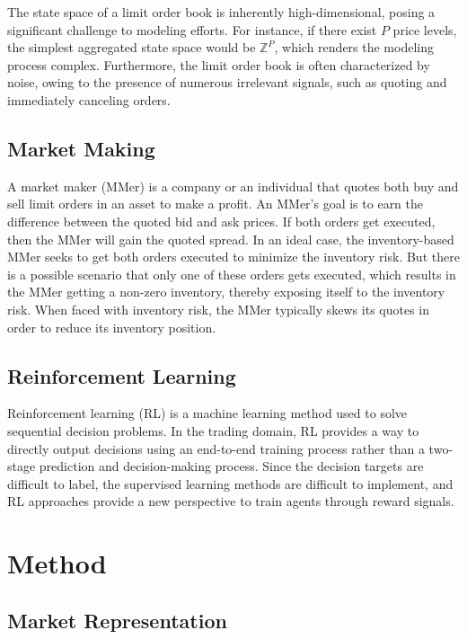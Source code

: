 \documentclass[conference]{IEEEtran}
\begin{document}
The state space of a limit order book is inherently high-dimensional, posing a significant challenge to modeling efforts. For instance, if there exist $P$ price levels, the simplest aggregated state space would be $\mathbb{Z}^{P}$, which renders the modeling process complex. Furthermore, the limit order book is often characterized by noise, owing to the presence of numerous irrelevant signals, such as quoting and immediately canceling orders.

\subsection{Market Making}
A market maker (MMer) is a company or an individual that quotes both buy and sell limit orders in an asset to make a profit. An MMer's goal is to earn the difference between the quoted bid and ask prices. If both orders get executed, then the MMer will gain the quoted spread. In an ideal case, the inventory-based MMer seeks to get both orders executed to minimize the inventory risk. But there is a possible scenario that only one of these orders gets executed, which results in the MMer getting a non-zero inventory, thereby exposing itself to the inventory risk. When faced with inventory risk, the MMer typically skews its quotes in order to reduce its inventory position.

\subsection{Reinforcement Learning}
Reinforcement learning (RL) is a machine learning method used to solve sequential decision problems. In the trading domain, RL provides a way to directly output decisions using an end-to-end training process rather than a two-stage prediction and decision-making process. Since the decision targets are difficult to label, the supervised learning methods are difficult to implement, and RL approaches provide a new perspective to train agents through reward signals.

\section{Method}
\subsection{Market Representation}
\end{document}
